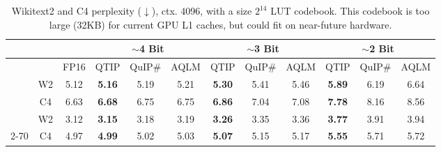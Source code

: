 \begin{table}[h]
\caption{Wikitext2 and C4 perplexity ($\downarrow$), ctx. 4096, \qts with a size $2^{14}$ LUT codebook. This codebook is too large (32KB) for current GPU L1 caches, but could fit on near-future hardware.}
\centering
\tabcolsep=0.1cm
\begin{tabular}{@{}cccccccccccc@{}}
                                              &                                                 &                                                   & \multicolumn{3}{c}{$\sim$4 Bit}                                            & \multicolumn{3}{c}{$\sim$3 Bit}                                            & \multicolumn{3}{c}{$\sim$2 Bit} \\ \midrule
                                              & \multicolumn{1}{c|}{}                           & \multicolumn{1}{c|}{FP16}                       & QTIP          & QuIP\# & \multicolumn{1}{c|}{AQLM}                         & QTIP          & QuIP\# & \multicolumn{1}{c|}{AQLM}                         & QTIP           & QuIP\#  & AQLM \\ \midrule
\rowcolor[HTML]{D9D9D9} 
\cellcolor[HTML]{D9D9D9}                      & \multicolumn{1}{c|}{\cellcolor[HTML]{D9D9D9}W2} & \multicolumn{1}{c|}{\cellcolor[HTML]{D9D9D9}5.12} & \textbf{5.16} & 5.19   & \multicolumn{1}{c|}{\cellcolor[HTML]{D9D9D9}5.21} & \textbf{5.30} & 5.41   & \multicolumn{1}{c|}{\cellcolor[HTML]{D9D9D9}5.46} & \textbf{5.89}  & 6.19    & 6.64 \\
\rowcolor[HTML]{D9D9D9} 
\multirow{-2}{*}{\cellcolor[HTML]{D9D9D9}2-7} & \multicolumn{1}{c|}{\cellcolor[HTML]{D9D9D9}C4} & \multicolumn{1}{c|}{\cellcolor[HTML]{D9D9D9}6.63} & \textbf{6.68} & 6.75   & \multicolumn{1}{c|}{\cellcolor[HTML]{D9D9D9}6.75} & \textbf{6.86} & 7.04   & \multicolumn{1}{c|}{\cellcolor[HTML]{D9D9D9}7.08} & \textbf{7.78}  & 8.16    & 8.56 \\
                                              & \multicolumn{1}{c|}{W2}                         & \multicolumn{1}{c|}{3.12}                         & \textbf{3.15} & 3.18   & \multicolumn{1}{c|}{3.19}                         & \textbf{3.26} & 3.35   & \multicolumn{1}{c|}{3.36}                         & \textbf{3.77}  & 3.91    & 3.94 \\
\multirow{-2}{*}{2-70}                        & \multicolumn{1}{c|}{C4}                         & \multicolumn{1}{c|}{4.97}                         & \textbf{4.99} & 5.02   & \multicolumn{1}{c|}{5.03}                         & \textbf{5.07} & 5.15   & \multicolumn{1}{c|}{5.17}                         & \textbf{5.55}  & 5.71    & 5.72 \\ \bottomrule
\end{tabular}
\label{tab:llamalut}
\end{table}